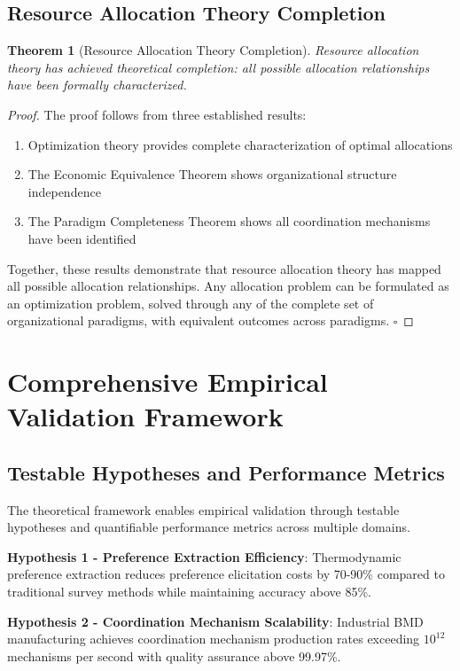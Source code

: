 \documentclass[12pt,a4paper]{article}
\newtheorem{theorem}{Theorem}
\begin{document}
\subsection{Resource Allocation Theory Completion}

\begin{theorem}[Resource Allocation Theory Completion]
Resource allocation theory has achieved theoretical completion: all possible allocation relationships have been formally characterized.
\end{theorem}

\begin{proof}
The proof follows from three established results:
\begin{enumerate}
\item Optimization theory provides complete characterization of optimal allocations
\item The Economic Equivalence Theorem shows organizational structure independence
\item The Paradigm Completeness Theorem shows all coordination mechanisms have been identified
\end{enumerate}

Together, these results demonstrate that resource allocation theory has mapped all possible allocation relationships. Any allocation problem can be formulated as an optimization problem, solved through any of the complete set of organizational paradigms, with equivalent outcomes across paradigms. $\square$
\end{proof}

\section{Comprehensive Empirical Validation Framework}

\subsection{Testable Hypotheses and Performance Metrics}

The theoretical framework enables empirical validation through testable hypotheses and quantifiable performance metrics across multiple domains.

\textbf{Hypothesis 1 - Preference Extraction Efficiency}: Thermodynamic preference extraction reduces preference elicitation costs by 70-90\% compared to traditional survey methods while maintaining accuracy above 85\%.

\textbf{Hypothesis 2 - Coordination Mechanism Scalability}: Industrial BMD manufacturing achieves coordination mechanism production rates exceeding $10^{12}$ mechanisms per second with quality assurance above 99.97\%.
\end{document}
